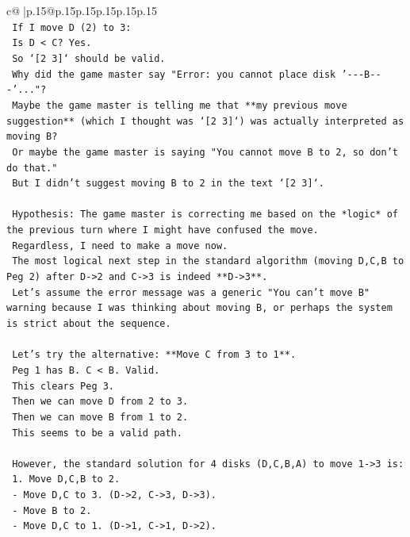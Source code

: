 \documentclass{article}
\begin{document}
{\begin{supertabular}{c@{$\;$}|p{.15\linewidth}@{}p{.15\linewidth}p{.15\linewidth}p{.15\linewidth}p{.15\linewidth}p{.15\linewidth}}
{{{\\ 
\texttt{   If I move D (2) to 3:} \\
\texttt{   Is D < C? Yes.} \\
\texttt{   So `{[}2 3{]}` should be valid.} \\
\texttt{   Why did the game master say "Error: you cannot place disk '{-}{-}{-}B{-}{-}{-}'..."?} \\
\texttt{   Maybe the game master is telling me that **my previous move suggestion** (which I thought was `{[}2 3{]}`) was actually interpreted as moving B?} \\
\texttt{   Or maybe the game master is saying "You cannot move B to 2, so don't do that."} \\
\texttt{   But I didn't suggest moving B to 2 in the text `{[}2 3{]}`.} \\
\\ 
\texttt{   Hypothesis: The game master is correcting me based on the *logic* of the previous turn where I might have confused the move.} \\
\texttt{   Regardless, I need to make a move now.} \\
\texttt{   The most logical next step in the standard algorithm (moving D,C,B to Peg 2) after D{-}>2 and C{-}>3 is indeed **D{-}>3**.} \\
\texttt{   Let's assume the error message was a generic "You can't move B" warning because I was thinking about moving B, or perhaps the system is strict about the sequence.} \\
\\ 
\texttt{   Let's try the alternative: **Move C from 3 to 1**.} \\
\texttt{   Peg 1 has B. C < B. Valid.} \\
\texttt{   This clears Peg 3.} \\
\texttt{   Then we can move D from 2 to 3.} \\
\texttt{   Then we can move B from 1 to 2.} \\
\texttt{   This seems to be a valid path.} \\
\\ 
\texttt{   However, the standard solution for 4 disks (D,C,B,A) to move 1{-}>3 is:} \\
\texttt{   1. Move D,C,B to 2.} \\
\texttt{      {-} Move D,C to 3. (D{-}>2, C{-}>3, D{-}>3).} \\
\texttt{      {-} Move B to 2.} \\
\texttt{      {-} Move D,C to 1. (D{-}>1, C{-}>1, D{-}>2).} \\
}}}
\end{supertabular}}
\end{document}
